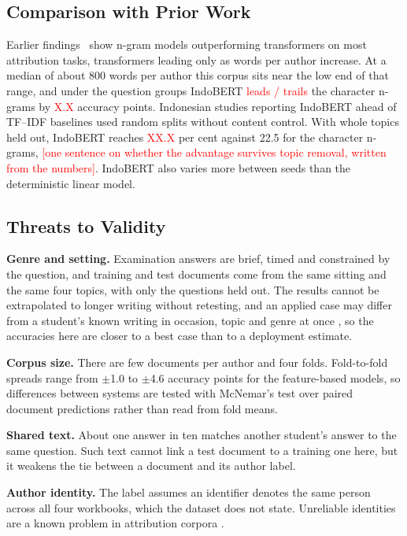 \documentclass[conference]{IEEEtran}
\newcommand{\tbd}[1]{\textcolor{red}{#1}}
\begin{document}
\subsection{Comparison with Prior Work}

Earlier findings~\cite{Tyo2022} show n-gram models outperforming transformers on most attribution tasks, transformers leading only as words per author increase. At a median of about 800 words per author this corpus sits near the low end of that range, and under the question groups IndoBERT \tbd{leads / trails} the character n-grams by \tbd{X.X} accuracy points. Indonesian studies reporting IndoBERT ahead of TF--IDF baselines \cite{Saputra2023,Saputra2024} used random splits without content control. With whole topics held out, IndoBERT reaches \tbd{XX.X} per cent against 22.5 for the character n-grams, \tbd{[one sentence on whether the advantage survives topic removal, written from the numbers]}. IndoBERT also varies more between seeds than the deterministic linear model.

\subsection{Threats to Validity}

\textbf{Genre and setting.} Examination answers are brief, timed and constrained by the question, and training and test documents come from the same sitting and the same four topics, with only the questions held out. The results cannot be extrapolated to longer writing without retesting, and an applied case may differ from a student's known writing in occasion, topic and genre at once \cite{Barlas2021}, so the accuracies here are closer to a best case than to a deployment estimate.

\textbf{Corpus size.} There are few documents per author and four folds. Fold-to-fold spreads range from $\pm$1.0 to $\pm$4.6 accuracy points for the feature-based models, so differences between systems are tested with McNemar's test over paired document predictions rather than read from fold means.

\textbf{Shared text.} About one answer in ten matches another student's answer to the same question. Such text cannot link a test document to a training one here, but it weakens the tie between a document and its author label.

\textbf{Author identity.} The label assumes an identifier denotes the same person across all four workbooks, which the dataset does not state. Unreliable identities are a known problem in attribution corpora \cite{Bogomolov2021}.
\end{document}
